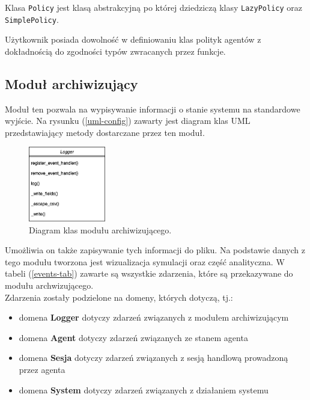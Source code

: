 \documentclass{article}
\begin{document}
Klasa \texttt{Policy} jest klasą abstrakcyjną po której dziedziczą klasy \texttt{LazyPolicy} oraz \texttt{SimplePolicy}.

Użytkownik posiada dowolność w definiowaniu klas polityk agentów z dokładnością do zgodności typów zwracanych przez funkcje.

\subsection{Moduł archiwizujący}

Moduł ten pozwala na wypisywanie informacji o stanie systemu na standardowe wyjście.
Na rysunku (\ref{uml-config}) zawarty jest diagram 
klas UML przedstawiający metody dostarczane przez ten moduł.

\begin{figure}[H]
	\centering
	\includegraphics[width=0.3\textwidth, height=0.3\textheight]{./png/logger-uml.png}
	\caption{Diagram klas modułu archiwizującego.}
	\label{logger-agent}
\end{figure}

Umożliwia on także zapisywanie tych informacji do pliku. 
Na podstawie danych z tego modułu tworzona jest wizualizacja symulacji oraz część analityczna.
W tabeli (\ref{events-tab}) zawarte są wszystkie zdarzenia, które są przekazywane do modułu archwizującego. \\
Zdarzenia zostały podzielone na domeny, których dotyczą, tj.:

\begin{itemize}
	\item domena \textbf{Logger} dotyczy zdarzeń związanych z modułem archiwizującym
	\item domena \textbf{Agent} dotyczy zdarzeń związanych ze stanem agenta 
	\item domena \textbf{Sesja} dotyczy zdarzeń związanych z sesją handlową prowadzoną przez agenta 
	\item domena \textbf{System} dotyczy zdarzeń związanych z działaniem systemu 
\end{itemize}
\end{document}
